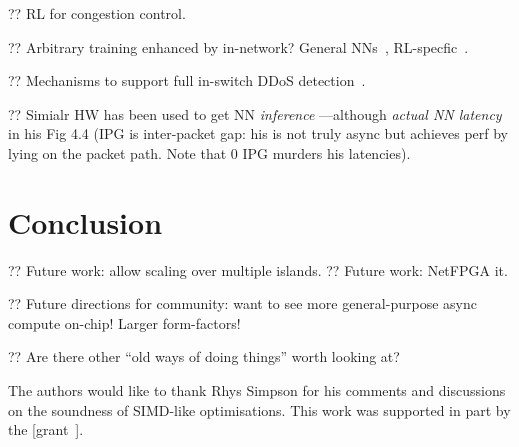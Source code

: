 \documentclass[sigconf,natbib=false]{acmart}
\begin{document}
?? RL for congestion control. ~\parencite{DBLP:journals/corr/abs-1910-04054}

?? Arbitrary training enhanced by in-network? General NNs~\parencite{DBLP:conf/micro/LiPAYQPWSEK18}, RL-specfic~\parencite{DBLP:conf/isca/LiLYCSH19}.

?? Mechanisms to support full in-switch DDoS detection~\cite{tnms-ddos-victim-ident}.

?? Simialr HW has been used to get NN \emph{inference} \textcite{langlet-ml-netronome}---although \emph{actual NN latency} in his Fig 4.4 (IPG is inter-packet gap: his is not truly async but achieves perf by lying on the packet path. Note that 0 IPG murders his latencies).

\section{Conclusion}

?? Future work: allow scaling over multiple islands.
?? Future work: NetFPGA it.

?? Future directions for community: want to see more general-purpose async compute on-chip! Larger form-factors!

?? Are there other ``old ways of doing things'' worth looking at?

\begin{acks}
	The authors would like to thank Rhys Simpson for his comments and discussions on the soundness of SIMD-like optimisations.
	This work was supported in part by the  [grant~].
\end{acks}
	
%
%
\printbibliography
\end{document}
